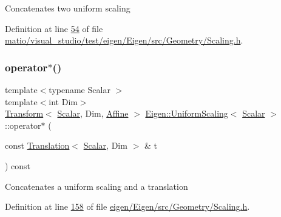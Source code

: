 Concatenates two uniform scaling 

Definition at line \hyperlink{matio_2visual__studio_2test_2eigen_2_eigen_2src_2_geometry_2_scaling_8h_source_l00054}{54} of file \hyperlink{matio_2visual__studio_2test_2eigen_2_eigen_2src_2_geometry_2_scaling_8h_source}{matio/visual\+\_\+studio/test/eigen/\+Eigen/src/\+Geometry/\+Scaling.\+h}.

\mbox{\label{class_eigen_1_1_uniform_scaling_a19c405341f2c861eb0ddfc4f760fecf8}} 
\subsubsection{\texorpdfstring{operator$\ast$()}{operator*()}\hspace{0.1cm}{\footnotesize\ttfamily [3/8]}}
{\footnotesize\ttfamily template$<$typename Scalar $>$ \\
template$<$int Dim$>$ \\
\hyperlink{group___geometry___module_class_eigen_1_1_transform}{Transform}$<$ \hyperlink{class_eigen_1_1_uniform_scaling_a04c4339f58f1210c5d4d34b1bd7ae283}{Scalar}, Dim, \hyperlink{group__enums_ggaee59a86102f150923b0cac6d4ff05107a71e768e0581725d919d0b05f4cb83234}{Affine} $>$ \hyperlink{class_eigen_1_1_uniform_scaling}{Eigen\+::\+Uniform\+Scaling}$<$ \hyperlink{class_eigen_1_1_uniform_scaling_a04c4339f58f1210c5d4d34b1bd7ae283}{Scalar} $>$\+::operator$\ast$ (\begin{DoxyParamCaption}\item[{const \hyperlink{group___geometry___module_class_eigen_1_1_translation}{Translation}$<$ \hyperlink{class_eigen_1_1_uniform_scaling_a04c4339f58f1210c5d4d34b1bd7ae283}{Scalar}, Dim $>$ \&}]{t }\end{DoxyParamCaption}) const\hspace{0.3cm}{\ttfamily [inline]}}

Concatenates a uniform scaling and a translation 

Definition at line \hyperlink{eigen_2_eigen_2src_2_geometry_2_scaling_8h_source_l00158}{158} of file \hyperlink{eigen_2_eigen_2src_2_geometry_2_scaling_8h_source}{eigen/\+Eigen/src/\+Geometry/\+Scaling.\+h}.

\mbox{\label{class_eigen_1_1_uniform_scaling_a660b56b8279e5c56fb9a736b131c542d}} 
